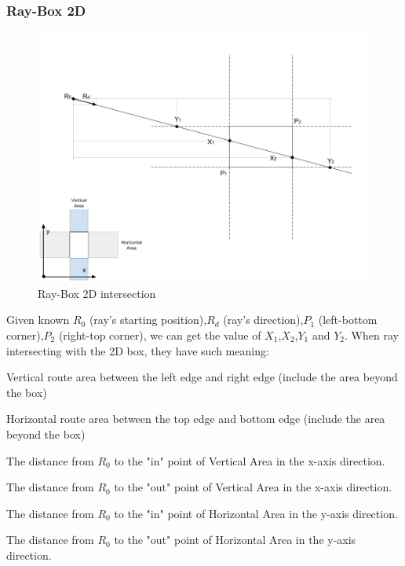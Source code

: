 \subsubsection{Ray-Box 2D}

\begin{figure}[H]
\caption{Ray-Box 2D intersection}
\label{fig:ray-box-2d}
\centering
\includegraphics[width=\textwidth, keepaspectratio]{Figures/ray-box-2d-intersection.png}
\decoRule
\end{figure}

Given known $R_0$ (ray's starting position),\enspace$R_d$ (ray's direction),\enspace$P_1$ (left-bottom corner),\enspace$P_2$ (right-top corner), we can get the value of $X_1$,\enspace$X_2$,\enspace$Y_1$ and $Y_2$. When ray intersecting with the 2D box, they have such meaning:

\begin{description}
	\setlength{\parskip}{0pt}
	\item[$\bullet$ Vertical Area] Vertical route area between the left edge and right edge (include the area beyond the box)
	\item[$\bullet$ Horizontal Area] Horizontal route area between the top edge and bottom edge (include the area beyond the box)
	\item[$\bullet$ $\mathbf{X}_1$] The distance from $R_0$ to the "in" point of Vertical Area in the x-axis direction.   
	\item[$\bullet$ $\mathbf{X}_2$] The distance from $R_0$ to the "out" point of Vertical Area in the x-axis direction. 
	\item[$\bullet$ $\mathbf{Y}_1$] The distance from $R_0$ to the "in" point of Horizontal Area in the y-axis direction.
	\item[$\bullet$ $\mathbf{Y}_2$] The distance from $R_0$ to the "out" point of Horizontal Area in the y-axis direction. 
\end{description}

